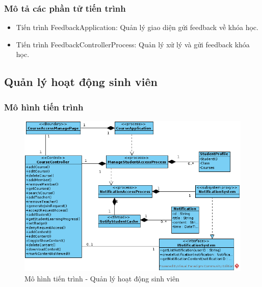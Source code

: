 \documentclass[./../main.tex]{subfiles}
\begin{document}
\subsubsection{Mô tả các phần tử tiến trình}

\begin{itemize}
	\item Tiến trình FeedbackApplication: Quản lý giao diện gửi feedback về khóa học.
	\item Tiến trình FeedbackControllerProcess: Quản lý xử lý và gửi feedback khóa học.
\end{itemize}

\subsection{Quản lý hoạt động sinh viên}

\subsubsection{Mô hình tiến trình}

\begin{figure}[H]
	\centering
	\includegraphics[width=\linewidth]{./images/pv_manage_studentactivity.png}
\caption{Mô hình tiến trình - Quản lý hoạt động sinh viên}

\end{figure}
\end{document}
